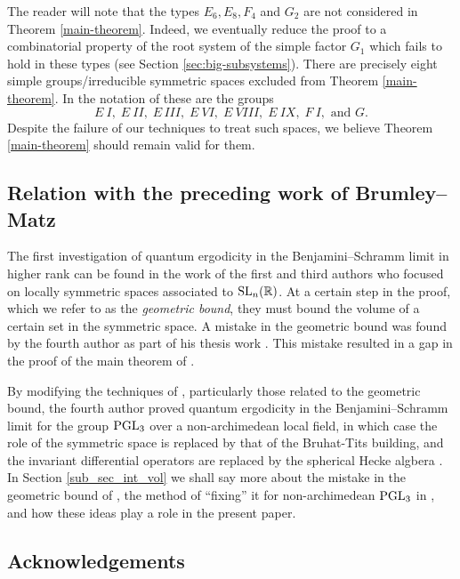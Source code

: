 \documentclass[12pt]{amsart}
\theoremstyle{remark}
\begin{document}
The reader will note that the types $E_6, E_8, F_4$ and $G_2$ are not considered in Theorem \ref{main-theorem}. Indeed, we eventually reduce the proof to a combinatorial property of the root system of the simple factor $G_1$ which fails to hold in these types (see Section \ref{sec:big-subsystems}). There are precisely eight simple groups/irreducible symmetric spaces excluded from Theorem \ref{main-theorem}. In the notation of  \cite[p. 532]{Helgason_01} these are the groups
\[
E \ I,\; E \ II,\; E\, III,\; E \ VI,\; E \ VIII,\; E \ IX,\; F \ I,\textrm{ and } G.
\]
Despite the failure of our techniques to treat such spaces, we believe Theorem \ref{main-theorem} should remain valid for them.

\subsection{Relation with the preceding work of Brumley--Matz}\label{hi-rank-intro}

The first investigation of quantum ergodicity in the Benjamini--Schramm limit in higher rank can be found in the work of the first and third authors \cite{Brumley_Matz_23} who focused on locally symmetric spaces associated to $\textnormal{SL}_n(\mathbb{R})$. At a certain step in the proof, which we refer to as the \textit{geometric bound}, they must bound the volume of a certain set in the symmetric space. A mistake in the geometric bound was found by the fourth author as part of his thesis work \cite{Peterson_thesis}. This mistake resulted in a gap in the proof of the main theorem of \cite{Brumley_Matz_23}. 

By modifying the techniques of \cite{Brumley_Matz_23}, particularly those related to the geometric bound, the fourth author proved quantum ergodicity in the Benjamini--Schramm limit for the group $\textnormal{PGL}_3$ over a non-archimedean local field, in which case the role of the symmetric space is replaced by that of the Bruhat-Tits building, and the invariant differential operators are replaced by the spherical Hecke algbera \cite{Peterson_23}. In Section \ref{sub_sec_int_vol} we shall say more about the mistake in the geometric bound of \cite{Brumley_Matz_23}, the method of ``fixing'' it for non-archimedean $\textnormal{PGL}_3$ in \cite{Peterson_23}, and how these ideas play a role in the present paper.

\subsection{Acknowledgements}
\end{document}
